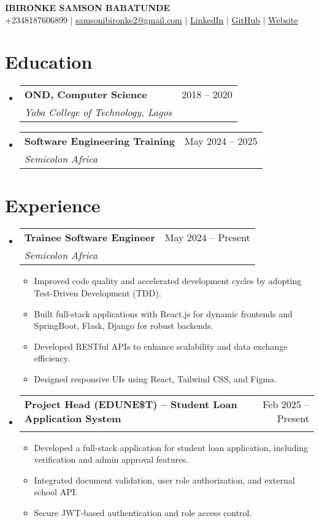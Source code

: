 \documentclass[letterpaper,11pt]{article}
\makeatletter
\newcommand{\resumeItem}[1]{
  \item\small{
    {#1 \vspace{-2pt}}
  }
}
\newcommand{\resumeSubheading}[4]{
  \vspace{-2pt}\item
    \begin{tabular*}{0.97\textwidth}[t]{l@{\extracolsep{\fill}}r}
      \textbf{#1} & #2 \\
      \textit{\small#3} & \textit{\small #4} \\
    \end{tabular*}\vspace{-7pt}
}
\newcommand{\resumeSubHeadingListStart}{\begin{itemize}[leftmargin=0.15in, label={}]}
\newcommand{\resumeSubHeadingListEnd}{\end{itemize}}
\newcommand{\resumeItemListStart}{\begin{itemize}}
\newcommand{\resumeItemListEnd}{\end{itemize}\vspace{-5pt}}
\makeatother
\begin{document}
\begin{center}
    \textbf{\Huge \scshape IBIRONKE SAMSON BABATUNDE} \\ \vspace{1pt}
    \small +2348187606899 $|$ \href{mailto:samsonibironke2@gmail.com}{\underline{samsonibironke2@gmail.com}} $|$ \href{https://linkedin.com/Samson-ibironke}{\underline{LinkedIn}} $|$ \href{https://github.com/samibyrone}{\underline{GitHub}} $|$ \href{https://ibironkesamson.netlify.app}{\underline{Website}}
\end{center}

\section{Education}
  \resumeSubHeadingListStart
    \resumeSubheading
      {OND, Computer Science}{2018 -- 2020}
      {Yaba College of Technology, Lagos}{}
    \resumeSubheading
      {Software Engineering Training}{May 2024 -- 2025}
      {Semicolon Africa}{}
  \resumeSubHeadingListEnd

\section{Experience}
  \resumeSubHeadingListStart
    \resumeSubheading
      {Trainee Software Engineer}{May 2024 -- Present}
      {Semicolon Africa}{}
      \resumeItemListStart
        \resumeItem{Improved code quality and accelerated development cycles by adopting Test-Driven Development (TDD).}
        \resumeItem{Built full-stack applications with React.js for dynamic frontends and SpringBoot, Flask, Django for robust backends.}
        \resumeItem{Developed RESTful APIs to enhance scalability and data exchange efficiency.}
        \resumeItem{Designed responsive UIs using React, Tailwind CSS, and Figma.}
      \resumeItemListEnd
    \resumeSubheading
      {Project Head (EDUNE\$T) -- Student Loan Application System}{Feb 2025 -- Present}
      {}{}
      \resumeItemListStart
        \resumeItem{Developed a full-stack application for student loan application, including verification and admin approval features.}
        \resumeItem{Integrated document validation, user role authorization, and external school API.}
        \resumeItem{Secure JWT-based authentication and role access control.}
      \resumeItemListEnd
  \resumeSubHeadingListEnd

\end{document}

